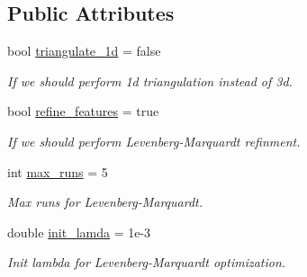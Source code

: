 \subsection*{Public Attributes}
\begin{DoxyCompactItemize}
\item 
\mbox{\label{structov__core_1_1FeatureInitializerOptions_aa55a78626d15ac6051ca0f7a5227d175}} 
bool \hyperlink{structov__core_1_1FeatureInitializerOptions_aa55a78626d15ac6051ca0f7a5227d175}{triangulate\+\_\+1d} = false
\begin{DoxyCompactList}\small\item\em If we should perform 1d triangulation instead of 3d. \end{DoxyCompactList}\item 
\mbox{\label{structov__core_1_1FeatureInitializerOptions_a5d67f467e1becbdc56132efb13f16992}} 
bool \hyperlink{structov__core_1_1FeatureInitializerOptions_a5d67f467e1becbdc56132efb13f16992}{refine\+\_\+features} = true
\begin{DoxyCompactList}\small\item\em If we should perform Levenberg-\/\+Marquardt refinment. \end{DoxyCompactList}\item 
\mbox{\label{structov__core_1_1FeatureInitializerOptions_a413a780bdbc3fa28267d4b88f5f8106a}} 
int \hyperlink{structov__core_1_1FeatureInitializerOptions_a413a780bdbc3fa28267d4b88f5f8106a}{max\+\_\+runs} = 5
\begin{DoxyCompactList}\small\item\em Max runs for Levenberg-\/\+Marquardt. \end{DoxyCompactList}\item 
\mbox{\label{structov__core_1_1FeatureInitializerOptions_a0228000bac963fb9125172a30dfe0b47}} 
double \hyperlink{structov__core_1_1FeatureInitializerOptions_a0228000bac963fb9125172a30dfe0b47}{init\+\_\+lamda} = 1e-\/3
\begin{DoxyCompactList}\small\item\em Init lambda for Levenberg-\/\+Marquardt optimization. \end{DoxyCompactList}\item 

\end{DoxyCompactItemize}
